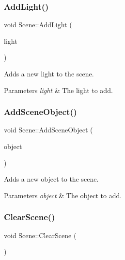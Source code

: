 \subsubsection{\texorpdfstring{Add\+Light()}{AddLight()}}
{\footnotesize\ttfamily void Scene\+::\+Add\+Light (\begin{DoxyParamCaption}\item[{std\+::shared\+\_\+ptr$<$ \hyperlink{class_light}{Light} $>$}]{light }\end{DoxyParamCaption})}



Adds a new light to the scene.


\begin{DoxyParams}{Parameters}
{\em light} & The light to add. \\
\hline
\end{DoxyParams}
\hypertarget{class_scene_a6e51f14c74c252d231b73d7109b8117e}{}\label{class_scene_a6e51f14c74c252d231b73d7109b8117e}
\subsubsection{\texorpdfstring{Add\+Scene\+Object()}{AddSceneObject()}}
{\footnotesize\ttfamily void Scene\+::\+Add\+Scene\+Object (\begin{DoxyParamCaption}\item[{std\+::shared\+\_\+ptr$<$ \hyperlink{class_scene_object}{Scene\+Object} $>$}]{object }\end{DoxyParamCaption})}



Adds a new object to the scene.


\begin{DoxyParams}{Parameters}
{\em object} & The object to add. \\
\hline
\end{DoxyParams}
\hypertarget{class_scene_ac3b0f6126be07f78a61abfac3487e4df}{}\label{class_scene_ac3b0f6126be07f78a61abfac3487e4df}
\subsubsection{\texorpdfstring{Clear\+Scene()}{ClearScene()}}
{\footnotesize\ttfamily void Scene\+::\+Clear\+Scene (\begin{DoxyParamCaption}{ }\end{DoxyParamCaption})}



